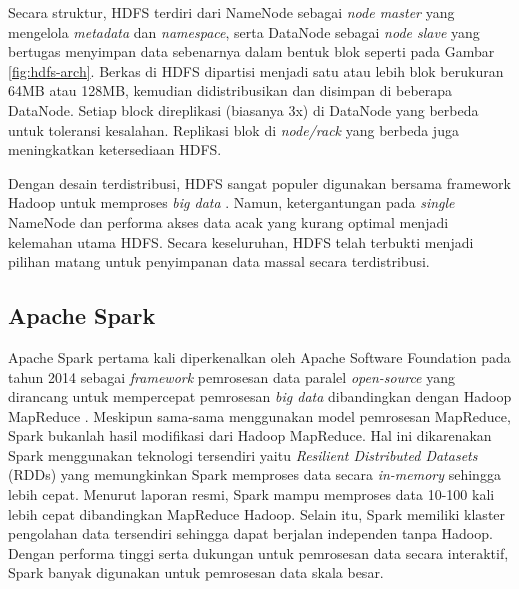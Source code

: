 Secara struktur, HDFS terdiri dari NameNode sebagai \textit{node master} yang mengelola \textit{metadata} dan \textit{namespace}, serta DataNode sebagai \textit{node slave} yang bertugas menyimpan data sebenarnya dalam bentuk blok seperti pada Gambar \ref{fig:hdfs-arch}. Berkas di HDFS dipartisi menjadi satu atau lebih blok berukuran 64MB atau 128MB, kemudian didistribusikan dan disimpan di beberapa DataNode. Setiap block direplikasi (biasanya 3x) di DataNode yang berbeda untuk toleransi kesalahan. Replikasi blok di \textit{node/rack} yang berbeda juga meningkatkan ketersediaan HDFS.

Dengan desain terdistribusi, HDFS sangat populer digunakan bersama framework Hadoop untuk memproses \textit{big data} \cite{almansouriHadoopDistributedFile2019}. Namun, ketergantungan pada \textit{single} NameNode dan performa akses data acak yang kurang optimal menjadi kelemahan utama HDFS. Secara keseluruhan, HDFS telah terbukti menjadi pilihan matang untuk penyimpanan data massal secara terdistribusi.

\subsection{Apache Spark}
Apache Spark pertama kali diperkenalkan oleh Apache Software Foundation pada tahun 2014 sebagai \textit{framework} pemrosesan data paralel \textit{open-source} yang dirancang untuk mempercepat pemrosesan \textit{big data} dibandingkan dengan  Hadoop MapReduce \cite{ApacheSparkUnified}. Meskipun sama-sama menggunakan model pemrosesan MapReduce, Spark bukanlah hasil modifikasi dari Hadoop MapReduce\cite{KOMPARASIKECEPATANHADOOP}. Hal ini dikarenakan Spark menggunakan teknologi tersendiri yaitu \textit{Resilient Distributed Datasets} (RDDs) yang memungkinkan Spark memproses data secara \textit{in-memory} sehingga lebih cepat. Menurut laporan resmi, Spark mampu memproses data 10-100 kali lebih cepat dibandingkan MapReduce Hadoop. Selain itu, Spark memiliki klaster pengolahan data tersendiri sehingga dapat berjalan independen tanpa Hadoop. Dengan performa tinggi serta dukungan untuk pemrosesan data secara interaktif, Spark banyak digunakan untuk pemrosesan data skala besar.

